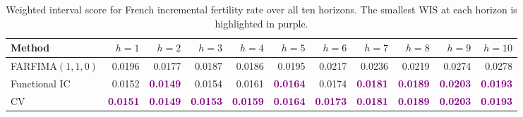 \begin{table}[!htb]
\centering
\begingroup\fontsize{7}{9}\selectfont
\setlength{\tabcolsep}{2.5pt}
\caption{Weighted interval score for French incremental fertility rate over all ten horizons. The smallest WIS at each horizon is highlighted in purple.}
\label{tab:emp-fertility-wis}
\begin{tabular}{lrrrrrrrrrr}
\toprule
Method & $h=1$ & $h=2$ & $h=3$ & $h=4$ & $h=5$ & $h=6$ & $h=7$ & $h=8$ & $h=9$ & $h=10$ \\
\midrule
FARFIMA$(1,1,0)$ & 0.0196 & 0.0177 & 0.0187 & 0.0186 & 0.0195 & 0.0217 & 0.0236 & 0.0219 & 0.0274 & 0.0278 \\
Functional IC & 0.0152 & \textcolor{purple}{\textbf{0.0149}} & 0.0154 & 0.0161 & \textcolor{purple}{\textbf{0.0164}} & 0.0174 & \textcolor{purple}{\textbf{0.0181}} & \textcolor{purple}{\textbf{0.0189}} & \textcolor{purple}{\textbf{0.0203}} & \textcolor{purple}{\textbf{0.0193}} \\
CV & \textcolor{purple}{\textbf{0.0151}} & \textcolor{purple}{\textbf{0.0149}} & \textcolor{purple}{\textbf{0.0153}} & \textcolor{purple}{\textbf{0.0159}} & \textcolor{purple}{\textbf{0.0164}} & \textcolor{purple}{\textbf{0.0173}} & \textcolor{purple}{\textbf{0.0181}} & \textcolor{purple}{\textbf{0.0189}} & \textcolor{purple}{\textbf{0.0203}} & \textcolor{purple}{\textbf{0.0193}} \\
\bottomrule
\end{tabular}
\endgroup
\end{table}

